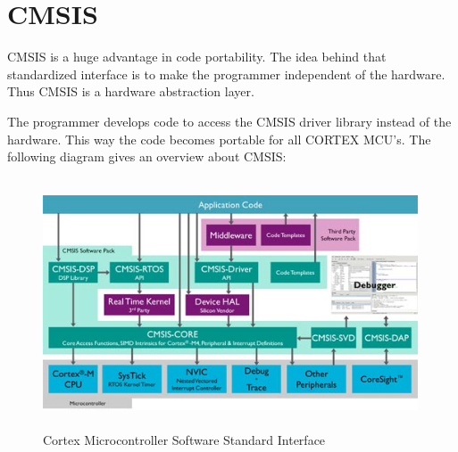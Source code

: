 \chapter{CMSIS}
CMSIS is a huge advantage in code portability. The idea behind that standardized
interface is to make the programmer independent of the hardware. Thus CMSIS is a
hardware abstraction layer.

The programmer develops code to access the CMSIS driver library instead of the
hardware. This way the code becomes portable for all CORTEX MCU's.
The following diagram gives an overview about CMSIS:\citep{ARM-CMSIS}

\begin{figure}[ht]
	\centering
	\includegraphics[width=420px, height=280px]{../img/cmsis.jpg}
	\caption{Cortex Microcontroller Software Standard Interface}
	\label{cmsis_}
\end{figure}
